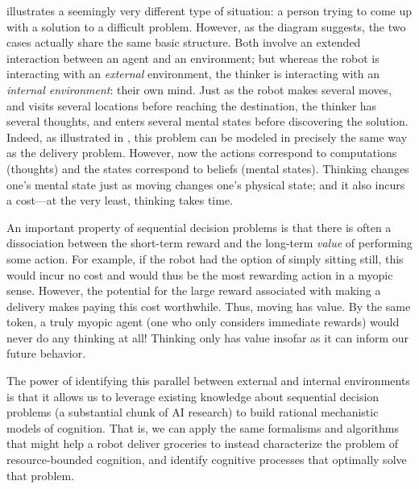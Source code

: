  illustrates a seemingly very different type of situation: a person trying to come up with a solution to a difficult problem. However, as the diagram suggests, the two cases actually share the same basic structure. Both involve an extended interaction between an agent and an environment; but whereas the robot is interacting with an \emph{external} environment, the thinker is interacting with an \emph{internal environment}: their own mind. Just as the robot makes several moves, and visits several locations before reaching the destination, the thinker has several thoughts, and enters several mental states before discovering the solution. Indeed, as illustrated in , this problem can be modeled in precisely the same way as the delivery problem. However, now the actions correspond to computations (thoughts) and the states correspond to beliefs (mental states). Thinking changes one's mental state just as moving changes one's physical state; and it also incurs a cost---at the very least, thinking takes time.

An important property of sequential decision problems is that there is often a dissociation between the short-term reward and the long-term \emph{value} of performing some action. For example, if the robot had the option of simply sitting still, this would incur no cost and would thus be the most rewarding action in a myopic sense. However, the potential for the large reward associated with making a delivery makes paying this cost worthwhile. Thus, moving has value. By the same token, a truly myopic agent (one who only considers immediate rewards) would never do any thinking at all! Thinking only has value insofar as it can inform our future behavior.\footnotemark{}


The power of identifying this parallel between external and internal environments is that it allows us to leverage existing knowledge about sequential decision problems (a substantial chunk of AI research) to build rational mechanistic models of cognition. That is, we can apply the same formalisms and algorithms that might help a robot deliver groceries to instead characterize the problem of resource-bounded cognition, and identify cognitive processes that optimally solve that problem.

